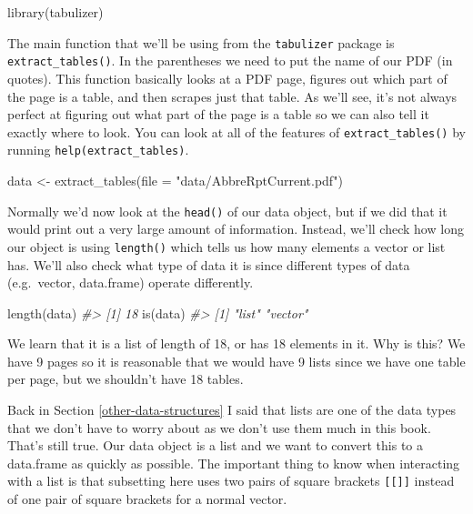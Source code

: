 \documentclass[
]{krantz}
\makeatletter
\newenvironment{Shaded}{\begin{snugshade}}{\end{snugshade}}
\newcommand{\AttributeTok}[1]{\textcolor[rgb]{0.61,0.61,0.61}{#1}}
\newcommand{\CommentTok}[1]{\textcolor[rgb]{0.37,0.37,0.37}{\textit{#1}}}
\newcommand{\FunctionTok}[1]{\textcolor[rgb]{0,0,0}{#1}}
\newcommand{\NormalTok}[1]{#1}
\newcommand{\OtherTok}[1]{\textcolor[rgb]{0.37,0.37,0.37}{#1}}
\newcommand{\StringTok}[1]{\textcolor[rgb]{0.5,0.5,0.5}{#1}}
\newenvironment{kframe}{%
\medskip{}
\setlength{\fboxsep}{.8em}
 \def\at@end@of@kframe{}%
 \ifinner\ifhmode%
  \def\at@end@of@kframe{\end{minipage}}%
  \begin{minipage}{\columnwidth}%
 \fi\fi%
 \def\FrameCommand##1{\hskip\@totalleftmargin \hskip-\fboxsep
 \colorbox{shadecolor}{##1}\hskip-\fboxsep
     \hskip-\linewidth \hskip-\@totalleftmargin \hskip\columnwidth}%
 \MakeFramed {\advance\hsize-\width
   \@totalleftmargin\z@ \linewidth\hsize
   \@setminipage}}%
 {\par\unskip\endMakeFramed%
 \at@end@of@kframe}
\renewenvironment{Shaded}{\begin{kframe}}{\end{kframe}}
\makeatother
\begin{document}
\begin{Shaded}
\begin{Highlighting}[]
\FunctionTok{library}\NormalTok{(tabulizer)}
\end{Highlighting}
\end{Shaded}

The main function that we'll be using from the \texttt{tabulizer} package is \texttt{extract\_tables()}. In the parentheses we need to put the name of our PDF (in quotes). This function basically looks at a PDF page, figures out which part of the page is a table, and then scrapes just that table. As we'll see, it's not always perfect at figuring out what part of the page is a table so we can also tell it exactly where to look. You can look at all of the features of \texttt{extract\_tables()} by running \texttt{help(extract\_tables)}.

\begin{Shaded}
\begin{Highlighting}[]
\NormalTok{data }\OtherTok{\textless{}{-}} \FunctionTok{extract\_tables}\NormalTok{(}\AttributeTok{file =} \StringTok{"data/AbbreRptCurrent.pdf"}\NormalTok{)}
\end{Highlighting}
\end{Shaded}

Normally we'd now look at the \texttt{head()} of our data object, but if we did that it would print out a very large amount of information. Instead, we'll check how long our object is using \texttt{length()} which tells us how many elements a vector or list has. We'll also check what type of data it is since different types of data (e.g.~vector, data.frame) operate differently.

\begin{Shaded}
\begin{Highlighting}[]
\FunctionTok{length}\NormalTok{(data)}
\CommentTok{\#\textgreater{} [1] 18}
\FunctionTok{is}\NormalTok{(data)}
\CommentTok{\#\textgreater{} [1] "list"   "vector"}
\end{Highlighting}
\end{Shaded}

We learn that it is a list of length of 18, or has 18 elements in it. Why is this? We have 9 pages so it is reasonable that we would have 9 lists since we have one table per page, but we shouldn't have 18 tables.

Back in Section \ref{other-data-structures} I said that lists are one of the data types that we don't have to worry about as we don't use them much in this book. That's still true. Our data object is a list and we want to convert this to a data.frame as quickly as possible. The important thing to know when interacting with a list is that subsetting here uses two pairs of square brackets \texttt{{[}{[}{]}{]}} instead of one pair of square brackets for a normal vector.
\end{document}

